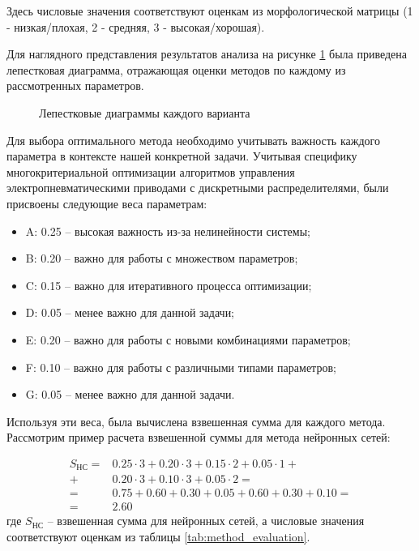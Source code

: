 Здесь числовые значения соответствуют оценкам из
морфологической матрицы (1 - низкая/плохая, 2 - средняя, 3 - высокая/хорошая).

Для наглядного представления результатов анализа на рисунке \ref{fig:morphological_analysis}
была приведена лепестковая диаграмма, отражающая оценки методов по каждому из
рассмотренных параметров.

\begin{figure}[ht]
    \caption{Лепестковые диаграммы каждого варианта}\label{fig:morphological_analysis}
\end{figure}

Для выбора оптимального метода необходимо учитывать важность
каждого параметра в контексте нашей конкретной задачи.
Учитывая специфику многокритериальной оптимизации алгоритмов
управления электропневматическими приводами с дискретными
распределителями, были присвоены следующие веса параметрам:

\begin{itemize}
    \item A: 0.25 -- высокая важность из-за нелинейности системы;
    \item B: 0.20 -- важно для работы с множеством параметров;
    \item C: 0.15 -- важно для итеративного процесса оптимизации;
    \item D: 0.05 -- менее важно для данной задачи;
    \item E: 0.20 -- важно для работы с новыми комбинациями параметров;
    \item F: 0.10 -- важно для работы с различными типами параметров;
    \item G: 0.05 -- менее важно для данной задачи.
\end{itemize}

Используя эти веса, была вычислена взвешенная сумма для каждого метода. Рассмотрим пример расчета взвешенной суммы для метода нейронных сетей:

\begin{equation}
    \begin{split}
        S_{НС} = & 0.25 \cdot 3 + 0.20 \cdot 3 + 0.15 \cdot 2 + 0.05 \cdot 1 + \\
        +        & 0.20 \cdot 3 + 0.10 \cdot 3 + 0.05 \cdot 2 =                \\
        =        & 0.75 + 0.60 + 0.30 + 0.05 + 0.60 + 0.30 + 0.10 =            \\
        =        & 2.60
    \end{split}
\end{equation}
где $S_{НС}$ -- взвешенная сумма для нейронных сетей, а числовые значения
соответствуют оценкам из таблицы \ref{tab:method_evaluation}.

